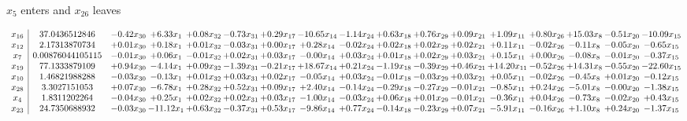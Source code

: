 \documentclass[9pt]{article}
\begin{document}
 $ x_{5} $ enters and $ x_{26} $ leaves 

 \[\begin{array}{c| c c@{\hskip 2pt} c@{\hskip 2pt} c@{\hskip 2pt} c@{\hskip 2pt} c@{\hskip 2pt} c@{\hskip 2pt} c@{\hskip 2pt} c@{\hskip 2pt} c@{\hskip 2pt} c@{\hskip 2pt} c@{\hskip 2pt} c@{\hskip 2pt} c@{\hskip 2pt} c@{\hskip 2pt} c@{\hskip 2pt} }
 x_{16}   &  37.0436512846 & -0.42 x_{30} & +  6.33 x_{1} & +  0.08 x_{32} & -0.73 x_{31} & +  0.29 x_{17} & -10.65 x_{14} & -1.14 x_{24} & +  0.63 x_{18} & +  0.76 x_{29} & +  0.09 x_{21} & +  1.09 x_{11} & +  0.80 x_{26} & + 15.03 x_{8} & -0.51 x_{20} & -10.09 x_{15}\\
 x_{12}   &  2.17313870734 & +  0.01 x_{30} & +  0.18 x_{1} & +  0.01 x_{32} & -0.03 x_{31} & +  0.00 x_{17} & +  0.28 x_{14} & -0.02 x_{24} & +  0.02 x_{18} & +  0.02 x_{29} & +  0.02 x_{21} & +  0.11 x_{11} & -0.02 x_{26} & -0.11 x_{8} & -0.05 x_{20} & -0.65 x_{15}\\
 x_{7}   &  0.00876044105115 & -0.01 x_{30} & +  0.06 x_{1} & -0.01 x_{32} & +  0.02 x_{31} & +  0.03 x_{17} & -0.00 x_{14} & +  0.03 x_{24} & +  0.01 x_{18} & +  0.02 x_{29} & +  0.03 x_{21} & +  0.15 x_{11} & +  0.00 x_{26} & -0.08 x_{8} & -0.01 x_{20} & -0.37 x_{15}\\
 x_{19}   &  77.1333879109 & +  0.94 x_{30} & -4.14 x_{1} & +  0.09 x_{32} & -1.39 x_{31} & -0.21 x_{17} & + 18.67 x_{14} & +  0.21 x_{24} & -1.19 x_{18} & -0.39 x_{29} & +  0.46 x_{21} & + 14.20 x_{11} & -0.52 x_{26} & + 14.31 x_{8} & -0.55 x_{20} & -22.60 x_{15}\\
 x_{10}   &  1.46821988288 & -0.03 x_{30} & -0.13 x_{1} & +  0.01 x_{32} & +  0.03 x_{31} & +  0.02 x_{17} & -0.05 x_{14} & +  0.03 x_{24} & -0.01 x_{18} & -0.03 x_{29} & +  0.03 x_{21} & +  0.05 x_{11} & -0.02 x_{26} & -0.45 x_{8} & +  0.01 x_{20} & -0.12 x_{15}\\
 x_{28}   &  3.3027151053 & +  0.07 x_{30} & -6.78 x_{1} & +  0.28 x_{32} & +  0.52 x_{31} & +  0.09 x_{17} & +  2.40 x_{14} & -0.14 x_{24} & -0.29 x_{18} & -0.27 x_{29} & -0.01 x_{21} & -0.85 x_{11} & +  0.24 x_{26} & -5.01 x_{8} & -0.00 x_{20} & -1.38 x_{15}\\
 x_{4}   &  1.8311202264 & -0.04 x_{30} & +  0.25 x_{1} & +  0.02 x_{32} & +  0.02 x_{31} & +  0.03 x_{17} & -1.00 x_{14} & -0.03 x_{24} & +  0.06 x_{18} & +  0.01 x_{29} & -0.01 x_{21} & -0.36 x_{11} & +  0.04 x_{26} & -0.73 x_{8} & -0.02 x_{20} & +  0.43 x_{15}\\
 x_{23}   &  24.7350688932 & -0.03 x_{30} & -11.12 x_{1} & +  0.63 x_{32} & -0.37 x_{31} & +  0.53 x_{17} & -9.86 x_{14} & +  0.77 x_{24} & -0.14 x_{18} & -0.23 x_{29} & +  0.07 x_{21} & -5.91 x_{11} & -0.16 x_{26} & +  1.10 x_{8} & +  0.24 x_{20} & -1.37 x_{15}\\

\end{array}\]
\end{document}
